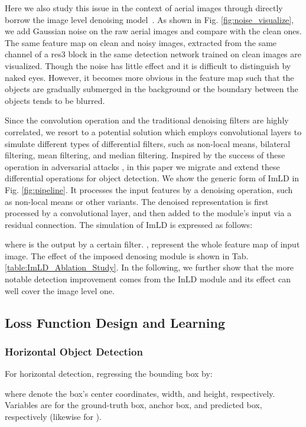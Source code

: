 \documentclass[10pt,journal,compsoc]{IEEEtran}
\begin{document}
Here we also study this issue in the context of aerial images through directly borrow the image level denoising model~\cite{xie2019feature}. As shown in Fig. \ref{fig:noise_visualize}, we add Gaussian noise on the raw aerial images and compare with the clean ones. The same feature map on clean and noisy images, extracted from the same channel of a res3 block in the same detection network trained on clean images are visualized. Though the noise has little effect and it is difficult to distinguish by naked eyes. However, it becomes more obvious in the feature map such that the objects are gradually submerged in the background or the boundary between the objects tends to be blurred.

Since the convolution operation and the traditional denoising filters are highly correlated, we resort to a potential solution \cite{xie2019feature} which employs convolutional layers to simulate different types of differential filters, such as non-local means, bilateral filtering, mean filtering, and median filtering. Inspired by the success of these operation in adversarial attacks \cite{xie2019feature}, in this paper we migrate and extend these differential operations for object detection. We show the generic form of ImLD in Fig. \ref{fig:pipeline}. It processes the input features by a denoising operation, such as non-local means or other variants. The denoised representation is first processed by a  convolutional layer, and then added to the module’s input via a residual connection. The simulation of ImLD is expressed as follows:

where  is the output by a certain filter. ,  represent the whole feature map of input image. The effect of the imposed denosing module is shown in Tab. \ref{table:ImLD_Ablation_Study}. In the following, we further show that the more notable detection improvement comes from the InLD module and its effect can well cover the image level one.


\subsection{Loss Function Design and Learning}\label{subsec:learning}
\subsubsection{Horizontal Object Detection}


For horizontal detection, regressing the bounding box by:

where  denote the box's center coordinates, width, and height, respectively. Variables  are for the ground-truth box, anchor box, and predicted box, respectively (likewise for ).
\end{document}
